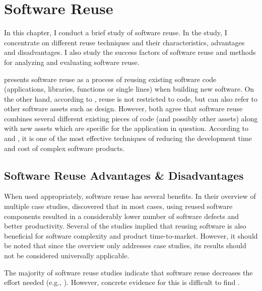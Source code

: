 
\chapter{Software Reuse}
\label{chapter:reuse}

In this chapter, I conduct a brief study of software reuse. In the study, I concentrate on different reuse techniques and their characteristics, advantages and disadvantages. I also study the success factors of software reuse and methods for analyzing and evaluating software reuse.

\citet{krueger_software_1992} presents software reuse as a process of reusing existing software code (applications, libraries, functions or single lines) when building new software. On the other hand, according to \citet{mohagheghi_empirical_2008}, reuse is not restricted to code, but can also refer to other software assets such as design. However, both agree that software reuse combines several different existing pieces of code (and possibly other assets) along with new assets which are specific for the application in question. According to \citet{mcilroy_mass-produced_1969} and \citet{boehm_managing_1999}, it is one of the most effective techniques of reducing the development time and cost of complex software products.

\section{Software Reuse Advantages \& Disadvantages}

When used appropriately, software reuse has several benefits. In their overview of multiple case studies, \citet{mohagheghi_empirical_2008} discovered that in most cases, using reused software components resulted in a considerably lower number of software defects and better productivity. Several of the studies implied that reusing software is also beneficial for software complexity and product time-to-market. However, it should be noted that since the overview only addresses case studies, its results should not be considered universally applicable.

The majority of software reuse studies indicate that software reuse decreases the effort needed (e.g., \citealt{mcilroy_mass-produced_1969, boehm_managing_1999, mohagheghi_empirical_2008}). However, concrete evidence for this is difficult to find \citep{mohagheghi_empirical_2008}.

